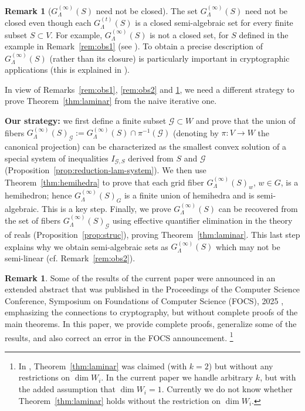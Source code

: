 \documentclass[10pt]{amsart}
\theoremstyle{plain}
\theoremstyle{definition}
\newtheorem{remark}[lemma]{Remark}
\providecommand{\cG}[0]{\ensuremath{\mathcal G}\xspace}
\begin{document}
\begin{remark}[$G^{(\infty)}_\Lambda(S)$ need not be closed]
\label{rem:obs3}
The set $G^{(\infty)}_\Lambda(S)$ need not be closed even though each $G^{(t)}_\Lambda(S)$ is a closed semi-algebraic set for every finite subset $S \subset V$.
For example, $G^{(\infty)}_\Lambda(S)$ is not a closed set,  
for $S$ defined in 
the example in Remark~\ref{rem:obs1} (see \cite{BKMN23}).
To obtain a precise description of  $G^{(\infty)}_\Lambda(S)$ (rather than its closure) is particularly important in cryptographic applications (this is explained in \cite{FOCS:BKMN22}).
\end{remark}

In view of Remarks~\ref{rem:obs1}, \ref{rem:obs2} and \ref{rem:obs3}, we need a different strategy to prove Theorem~\ref{thm:laminar} from the naive iterative one. 

\medskip
\noindent
\textbf{Our strategy:}
    we first define a finite subset $\cG \subset W$ and prove that 
    the union of fibers $G^{(\infty)}_\Lambda(S)_\cG := G^{(\infty)}_\Lambda(S) \cap \pi^{-1}(\cG)$ 
    (denoting by $\pi:V \rightarrow W$ the canonical projection) 
    can be characterized as the smallest convex solution of a special system of inequalities $I_{\cG, S}$ derived from $S$ and $\cG$ (Proposition~\ref{prop:reduction-lam-system}). 
    We then use Theorem~\ref{thm:hemihedra} to prove that each grid fiber
\(G_\Lambda^{(\infty)}(S)_w\), \(w\in G\), is a hemihedron; hence
\(G_\Lambda^{(\infty)}(S)_G\) is a finite union of hemihedra and is
semi-algebraic. This is a key step. Finally, we prove 
    $G^{(\infty)}_\Lambda(S)$ can be recovered from the set of fibers $G^{(\infty)}_\Lambda(S)_\cG$ 
     using effective quantifier elimination in the theory of reals (Proposition~\ref{prop:struc}), proving Theorem~\ref{thm:laminar}.
     This last step explains why we obtain semi-algebraic sets as 
     $G^{(\infty)}_\Lambda(S)$ which may not be semi-linear (cf. Remark~\ref{rem:obs2}).
\begin{remark}
\label{rem:focs}
Some of the results of the current paper were announced in an
extended abstract
that was published in the Proceedings of the Computer Science Conference, Symposium on Foundations of Computer Science (FOCS), 2025 \cite{FOCS:BKMN25}, 
emphasizing the connections to cryptography,
but without complete proofs of the main theorems. In this paper, we
provide complete proofs, generalize some of the results, 
and also correct an error in the FOCS announcement.
\footnote{
In \cite{FOCS:BKMN25}, 
Theorem~\ref{thm:laminar} was claimed (with $k = 2$) but without any restrictions
on $\dim W_i$. In the current paper we handle arbitrary $k$, but with the added assumption that $\dim W_i =1$. Currently we do not know whether Theorem~\ref{thm:laminar} holds without the restriction on $\dim W_i$.
}
\end{remark}
\end{document}
